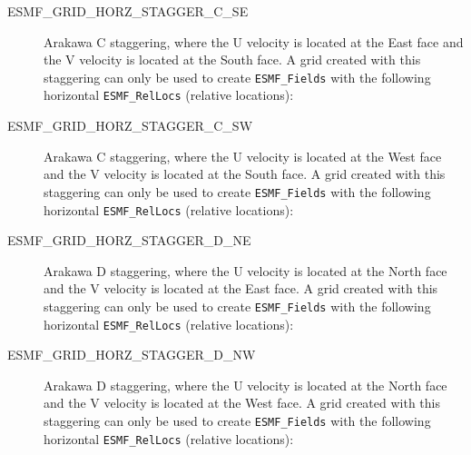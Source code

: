 \begin{description}
    \item [ESMF\_GRID\_HORZ\_STAGGER\_C\_SE]
          Arakawa C staggering, where the U velocity is located at the East face
          and the V velocity is located at the South face.  A grid created with
          this staggering can only be used to create {\tt ESMF\_Fields} with the
          following horizontal {\tt ESMF\_RelLocs} (relative locations):

    \item [ESMF\_GRID\_HORZ\_STAGGER\_C\_SW]
          Arakawa C staggering, where the U velocity is located at the West face
          and the V velocity is located at the South face.  A grid created with
          this staggering can only be used to create {\tt ESMF\_Fields} with the
          following horizontal {\tt ESMF\_RelLocs} (relative locations):

    \item [ESMF\_GRID\_HORZ\_STAGGER\_D\_NE]
          Arakawa D staggering, where the U velocity is located at the North face
          and the V velocity is located at the East face.  A grid created with
          this staggering can only be used to create {\tt ESMF\_Fields} with the
          following horizontal {\tt ESMF\_RelLocs} (relative locations):

    \item [ESMF\_GRID\_HORZ\_STAGGER\_D\_NW]
          Arakawa D staggering, where the U velocity is located at the North face
          and the V velocity is located at the West face.  A grid created with
          this staggering can only be used to create {\tt ESMF\_Fields} with the
          following horizontal {\tt ESMF\_RelLocs} (relative locations):


\end{description}
